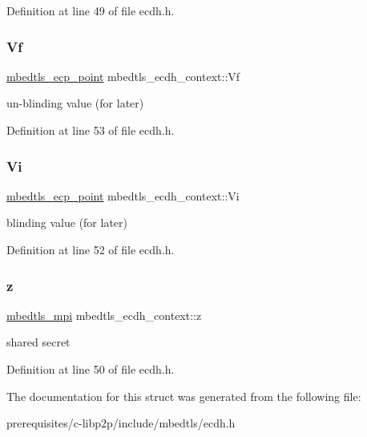 Definition at line 49 of file ecdh.\+h.

\mbox{\label{structmbedtls__ecdh__context_a2ee12052791b2f212047a16b4e0dcc77}} 
\subsubsection{\texorpdfstring{Vf}{Vf}}
{\footnotesize\ttfamily \mbox{\hyperlink{structmbedtls__ecp__point}{mbedtls\+\_\+ecp\+\_\+point}} mbedtls\+\_\+ecdh\+\_\+context\+::\+Vf}

un-\/blinding value (for later) 

Definition at line 53 of file ecdh.\+h.

\mbox{\label{structmbedtls__ecdh__context_a6e374b0be49dce0fb02ca8ccfbfe1fee}} 
\subsubsection{\texorpdfstring{Vi}{Vi}}
{\footnotesize\ttfamily \mbox{\hyperlink{structmbedtls__ecp__point}{mbedtls\+\_\+ecp\+\_\+point}} mbedtls\+\_\+ecdh\+\_\+context\+::\+Vi}

blinding value (for later) 

Definition at line 52 of file ecdh.\+h.

\mbox{\label{structmbedtls__ecdh__context_abfd253d99f23c57cbeafc41985db764c}} 
\subsubsection{\texorpdfstring{z}{z}}
{\footnotesize\ttfamily \mbox{\hyperlink{structmbedtls__mpi}{mbedtls\+\_\+mpi}} mbedtls\+\_\+ecdh\+\_\+context\+::z}

shared secret 

Definition at line 50 of file ecdh.\+h.



The documentation for this struct was generated from the following file\+:\begin{DoxyCompactItemize}
\item 
prerequisites/c-\/libp2p/include/mbedtls/ecdh.\+h\end{DoxyCompactItemize}
